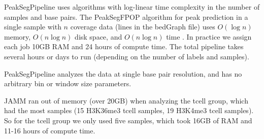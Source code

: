 \documentclass{article}
\begin{document}
PeakSegPipeline uses algorithms with log-linear time complexity in the
number of samples and base pairs. The PeakSegFPOP algorithm for peak
prediction in a single sample with $n$ coverage data (lines in the
bedGraph file) uses $O(\log n)$ memory, $O(n \log n)$ disk space, and 
$O(n\log n)$ time
\citep{Hocking-constrained-changepoint-detection}. In practice we
assign each job 10GB RAM and 24 hours of compute time. The total
pipeline takes several hours or days to run (depending on the number
of labels and samples).

PeakSegPipeline analyzes the data at single base pair resolution, and
has no arbitrary bin or window size parameters.

JAMM ran out of memory (over 20GB) when analyzing the tcell group, which
had the most samples (15 H3K36me3 tcell samples, 19 H3K4me3 tcell
samples). So for the tcell group we only used five samples, which took
16GB of RAM and 11-16 hours of compute time.



\end{document}
